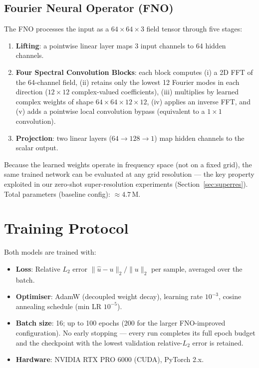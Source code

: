 \documentclass[11pt,a4paper]{article}
\begin{document}
\subsection{Fourier Neural Operator (FNO)}
The FNO \cite{li2021fno} processes the input as a $64\times64\times3$ field tensor through five stages:
\begin{enumerate}[nosep]
  \item \textbf{Lifting}: a pointwise linear layer maps 3 input channels to 64 hidden channels.
  \item \textbf{Four Spectral Convolution Blocks}: each block computes (i) a 2D FFT of the 64-channel field, (ii) retains only the lowest 12 Fourier modes in each direction ($12\times12$ complex-valued coefficients), (iii) multiplies by learned complex weights of shape $64\times64\times12\times12$, (iv) applies an inverse FFT, and (v) adds a pointwise local convolution bypass (equivalent to a $1\times1$ convolution).
  \item \textbf{Projection}: two linear layers ($64\to128\to1$) map hidden channels to the scalar output.
\end{enumerate}
Because the learned weights operate in frequency space (not on a fixed grid), the same trained network can be evaluated at any grid resolution --- the key property exploited in our zero-shot super-resolution experiments (Section~\ref{sec:superres}). Total parameters (baseline config): $\approx 4.7$\,M.

\section{Training Protocol}

Both models are trained with:
\begin{itemize}[nosep]
  \item \textbf{Loss}: Relative $L_2$ error $\|{\hat{u} - u}\|_2 / \|{u}\|_2$ per sample, averaged over the batch.
  \item \textbf{Optimiser}: AdamW (decoupled weight decay), learning rate $10^{-3}$, cosine annealing schedule (min LR $10^{-5}$).
  \item \textbf{Batch size}: 16; up to 100 epochs (200 for the larger FNO-improved configuration). No early stopping --- every run completes its full epoch budget and the checkpoint with the lowest validation relative-$L_2$ error is retained.
  \item \textbf{Hardware}: NVIDIA RTX PRO 6000 (CUDA), PyTorch 2.x.
\end{itemize}
\end{document}
